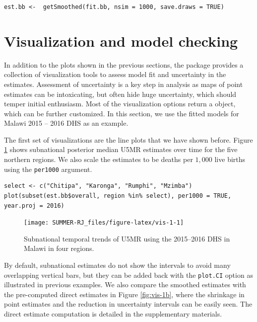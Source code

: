 \begin{verbatim}
est.bb <-  getSmoothed(fit.bb, nsim = 1000, save.draws = TRUE) 
\end{verbatim}

\section{Visualization and model checking}\label{visualization-and-model-checking}

In addition to the plots shown in the previous sections, the  package provides a collection of visualization tools to assess model fit and uncertainty in the estimates. Assessment of uncertainty is a key step in analysis as maps of point estimates can be intoxicating, but often hide huge uncertainty, which should temper initial enthusiasm. Most of the visualization options return a  object, which can be further customized. In this section, we use the fitted models for Malawi 2015 -- 2016 DHS as an example.

The first set of visualizations are the line plots that we have shown before. Figure \ref{fig:vis-1} shows subnational posterior median U5MR estimates over time for the five northern regions. We also scale the estimates to be deaths per \(1,000\) live births using the \texttt{per1000} argument.

\begin{verbatim}
select <- c("Chitipa", "Karonga", "Rumphi", "Mzimba")
plot(subset(est.bb$overall, region %in% select), per1000 = TRUE, year.proj = 2016)
\end{verbatim}

\begin{figure}[!ht]

{\centering \texttt{[image: SUMMER-RJ\_files/figure-latex/vis-1-1]} 

}

\caption{Subnational temporal trends of U5MR using the 2015--2016 DHS in Malawi in four regions.}\label{fig:vis-1}
\end{figure}

By default, subnational estimates do not show the intervals to avoid many overlapping vertical bars, but they can be added back with the \texttt{plot.CI} option as illustrated in previous examples. We also compare the smoothed estimates with the pre-computed direct estimates in Figure \ref{fig:vis-1b}, where the shrinkage in point estimates and the reduction in uncertainty intervals can be easily seen. The direct estimate computation is detailed in the supplementary materials.

